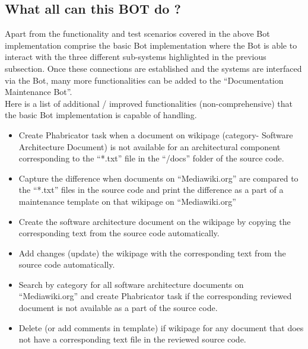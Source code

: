 \subsection{What all can this BOT do ? }
\indent Apart from the functionality and test scenarios covered in the above Bot implementation comprise the basic Bot implementation where the Bot is able to interact with the three different sub-systems highlighted in the previous subsection. Once these connections are established and the systems are interfaced via the Bot, many more functionalities can be added to the \enquote{Documentation Maintenance Bot}.
\\\indent Here is a list of additional / improved functionalities (non-comprehensive) that the basic Bot implementation is capable of handling.
\begin{itemize}
\item Create Phabricator task when a document on wikipage (category- Software Architecture Document) is not available for an architectural component corresponding to the \enquote{*.txt} file in the \enquote{/docs} folder of the source code.
\item Capture the difference when documents on \enquote{Mediawiki.org} are compared to the \enquote{*.txt} files in the source code and print the difference as a part of a maintenance template on that wikipage on \enquote{Mediawiki.org}
\item Create the software architecture document on the wikipage by copying the corresponding text from the source code automatically.
\item Add changes (update) the wikipage with the corresponding text from the source code automatically.
\item Search by category for all software architecture documents on \enquote{Mediawiki.org} and create Phabricator task if the corresponding reviewed document is not available as a part of the source code.
\item Delete (or add comments in template) if wikipage for any document that does not have a corresponding text file in the reviewed source code.
\end{itemize}



